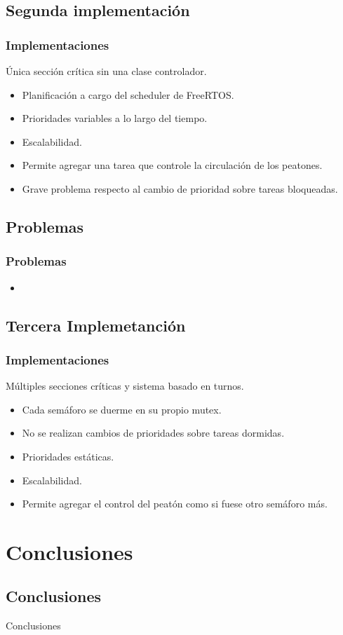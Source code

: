 \subsection{Segunda implementación}
\begin{frame}
\frametitle{Implementaciones}
\begin{block}{Única sección crítica sin una clase controlador.}
	\begin{itemize}
		\item Planificación a cargo del scheduler de FreeRTOS.
		\item Prioridades variables a lo largo del tiempo.
		\item Escalabilidad.
		\item Permite agregar una tarea que controle la circulación de los peatones.
		\item Grave problema respecto al cambio de prioridad sobre tareas bloqueadas.
	\end{itemize}
\end{block}
\end{frame}

\subsection{Problemas}
\begin{frame}
\frametitle{Problemas}
\begin{block}{}
	\begin{itemize}
		\item
	\end{itemize}
\end{block}
\end{frame}

\subsection{Tercera Implemetanción}
\begin{frame}
\frametitle{Implementaciones}
\begin{block}{Múltiples secciones críticas y sistema basado en turnos.}
	\begin{itemize}
		\item Cada semáforo se duerme en su propio mutex.
		\item No se realizan cambios de prioridades sobre tareas dormidas.
		\item Prioridades estáticas.
		\item Escalabilidad.
		\item Permite agregar el control del peatón como si fuese otro semáforo más.
	\end{itemize}
\end{block}
\end{frame}

\section{Conclusiones}

\subsection{Conclusiones}
\begin{frame}
	\begin{block}{Conclusiones}
	\end{block}
\end{frame}